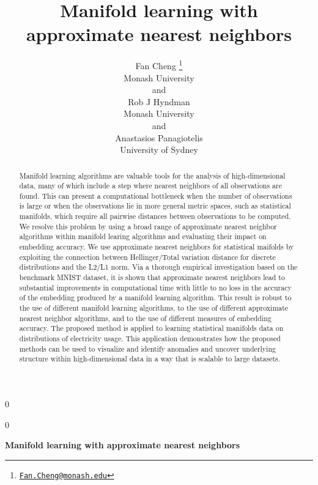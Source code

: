 \documentclass[12pt]{article}
\newcommand{\blind}{0}
\begin{document}
\def\spacingset#1{\renewcommand{\baselinestretch}%
{#1}\small\normalsize} \spacingset{1}



\blind
{
  \title{\bf Manifold learning with approximate nearest neighbors}

  \author{
        Fan Cheng \thanks{\href{mailto:Fan.Cheng@monash.edu}{\nolinkurl{Fan.Cheng@monash.edu}}} \\
    Monash University\\
     and \\     Rob J Hyndman \\
    Monash University\\
     and \\     Anastasios Panagiotelis \\
    University of Sydney\\
      }
  \maketitle
} \fi

\blind
{
  \bigskip
  \bigskip
  \bigskip
  \begin{center}
    {\LARGE\bf Manifold learning with approximate nearest neighbors}
  \end{center}
  \medskip
} \fi

\bigskip
\begin{abstract}
Manifold learning algorithms are valuable tools for the analysis of high-dimensional data, many of which include a step where nearest neighbors of all observations are found. This can present a computational bottleneck when the number of observations is large or when the observations lie in more general metric spaces, such as statistical manifolds, which require all pairwise distances between observations to be computed. We resolve this problem by using a broad range of approximate nearest neighbor algorithms within manifold learing algorithms and evaluating their impact on embedding accuracy. We use approximate nearest neighbors for statistical maifolds by exploiting the connection between Hellinger/Total variation distance for discrete distributions and the L2/L1 norm. Via a thorough empirical investigation based on the benchmark MNIST dataset, it is shown that approximate nearest neighbors lead to substantial improvements in computational time with little to no loss in the accuracy of the embedding produced by a manifold learning algorithm. This result is robust to the use of different manifold learning algorithms, to the use of different approximate nearest neighbor algorithms, and to the use of different measures of embedding accuracy. The proposed method is applied to learning statistical manifolds data on distributions of electricity usage. This application demonstrates how the proposed methods can be used to visualize and identify anomalies and uncover underlying structure within high-dimensional data in a way that is scalable to large datasets.
\end{abstract}
\end{document}
